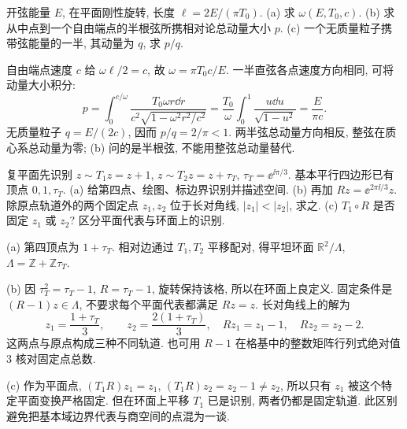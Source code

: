 \begin{exercise}
开弦能量 $E$, 在平面刚性旋转, 长度 $\ell=2E/(\pi T_0)$.
(a) 求 $\omega(E,T_0,c)$.
(b) 求从中点到一个自由端点的半根弦所携相对论总动量大小 $p$.
(c) 一个无质量粒子携带弦能量的一半, 其动量为 $q$, 求 $p/q$.
\end{exercise}
\begin{solution}
自由端点速度 $c$ 给 $\omega\ell/2=c$, 故 $\omega=\pi T_0c/E$.
一半直弦各点速度方向相同, 可将动量大小积分:
\[
 p=\int_0^{c/\omega}
 \frac{T_0\omega r\dd r}{c^2\sqrt{1-\omega^2r^2/c^2}}
 =\frac{T_0}{\omega}\int_0^1\frac{u\dd u}{\sqrt{1-u^2}}
 =\frac{E}{\pi c}.
\]
无质量粒子 $q=E/(2c)$, 因而 $p/q=2/\pi<1$.
两半弦总动量方向相反, 整弦在质心系总动量为零; (b) 问的是半根弦, 不能用整弦总动量替代.
\end{solution}

\begin{exercise}
复平面先识别 $z\sim T_1z=z+1$, $z\sim T_2z=z+\tau_T$, $\tau_T=\ee^{\ii\pi/3}$.
基本平行四边形已有顶点 $0,1,\tau_T$.
(a) 给第四点、绘图、标边界识别并描述空间.
(b) 再加 $Rz=\ee^{2\pi\ii/3}z$. 除原点轨道外的两个固定点 $z_1,z_2$ 位于长对角线, $|z_1|<|z_2|$, 求之.
(c) $T_1\circ R$ 是否固定 $z_1$ 或 $z_2$? 区分平面代表与环面上的识别.
\end{exercise}
\begin{solution}
(a) 第四顶点为 $1+\tau_T$. 相对边通过 $T_1,T_2$ 平移配对, 得平坦环面 $\mathbb R^2/\Lambda$, $\Lambda=\mathbb Z+\mathbb Z\tau_T$.

(b) 因 $\tau_T^2=\tau_T-1$, $R=\tau_T-1$, 旋转保持该格, 所以在环面上良定义. 固定条件是 $(R-1)z\in\Lambda$, 不要求每个平面代表都满足 $Rz=z$. 长对角线上的解为
\[
 z_1=\frac{1+\tau_T}{3},\qquad
 z_2=\frac{2(1+\tau_T)}3,
 \quad Rz_1=z_1-1,\quad Rz_2=z_2-2.
\]
这两点与原点构成三种不同轨道. 也可用 $R-1$ 在格基中的整数矩阵行列式绝对值 3 核对固定点总数.

\begin{center}
\end{center}

(c) 作为平面点, $(T_1R)z_1=z_1$, $(T_1R)z_2=z_2-1\ne z_2$, 所以只有 $z_1$ 被这个特定平面变换严格固定.
但在环面上平移 $T_1$ 已是识别, 两者仍都是固定轨道. 此区别避免把基本域边界代表与商空间的点混为一谈.
\end{solution}

